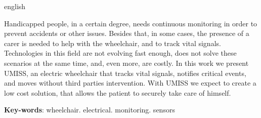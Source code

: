 \begin{resumo}[Abstract]
\begin{otherlanguage*}{english}

Handicapped people, in a certain degree, needs continuous monitoring in
order to prevent accidents or other issues. Besides that, in some cases, the
presence of a carer is needed to help with the wheelchair, and to track vital
signals.
Technologies in this field are not evolving fast enough, does not solve
these scenarios at the same time, and, even more, are costly.
In this work we present UMISS, an electric wheelchair that tracks vital
signals, notifies critical events, and moves without third parties intervention.
With UMISS we expect to create a low cost solution, that allows the
patient to securely take care of himself.


   \vspace{\onelineskip}
   \noindent 
   \textbf{Key-words}: wheelchair. electrical. monitoring. sensors
 \end{otherlanguage*}
\end{resumo}
